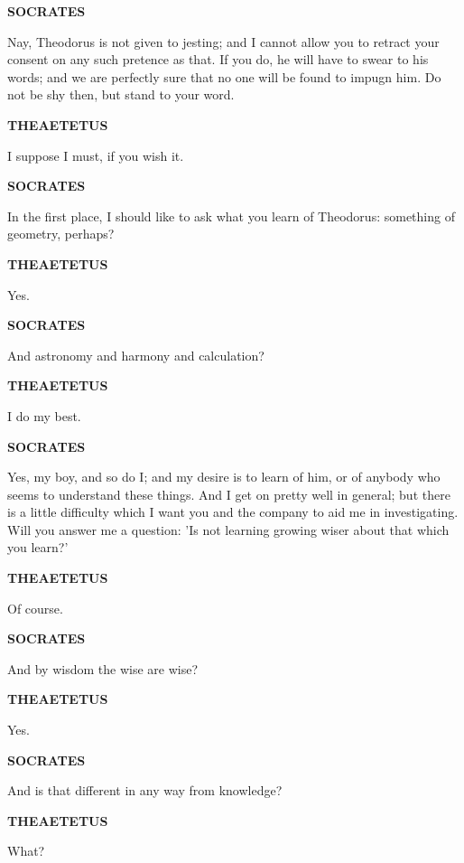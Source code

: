 \documentclass[11pt,letter]{article}
\begin{document}
\par \textbf{SOCRATES}
\par   Nay, Theodorus is not given to jesting; and I cannot allow you to retract your consent on any such pretence as that. If you do, he will have to swear to his words; and we are perfectly sure that no one will be found to impugn him. Do not be shy then, but stand to your word.

\par \textbf{THEAETETUS}
\par   I suppose I must, if you wish it.

\par \textbf{SOCRATES}
\par   In the first place, I should like to ask what you learn of Theodorus:  something of geometry, perhaps?

\par \textbf{THEAETETUS}
\par   Yes.

\par \textbf{SOCRATES}
\par   And astronomy and harmony and calculation?

\par \textbf{THEAETETUS}
\par   I do my best.

\par \textbf{SOCRATES}
\par   Yes, my boy, and so do I; and my desire is to learn of him, or of anybody who seems to understand these things. And I get on pretty well in general; but there is a little difficulty which I want you and the company to aid me in investigating. Will you answer me a question:  'Is not learning growing wiser about that which you learn?'

\par \textbf{THEAETETUS}
\par   Of course.

\par \textbf{SOCRATES}
\par   And by wisdom the wise are wise?

\par \textbf{THEAETETUS}
\par   Yes.

\par \textbf{SOCRATES}
\par   And is that different in any way from knowledge?

\par \textbf{THEAETETUS}
\par   What?
\end{document}
